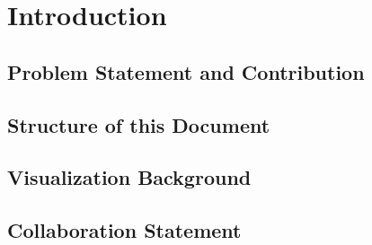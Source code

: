 \section{Introduction}

\subsection{Problem Statement and Contribution}

\subsection{Structure of this Document}

\subsection{Visualization Background}


\subsection{Collaboration Statement}